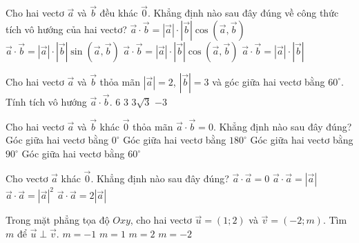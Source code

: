
\begin{ex}%
Cho hai vectơ $\vec{a}$ và $\vec{b}$ đều khác $\vec{0}$. Khẳng định nào sau đây đúng về công thức tích vô hướng của hai vectơ?
\choice
{$\vec{a}\cdot\vec{b}=|\vec{a}|\cdot|\vec{b}|\cos(\vec{a},\vec{b})$}
{$\vec{a}\cdot\vec{b}=|\vec{a}|\cdot|\vec{b}|\sin(\vec{a},\vec{b})$}
{\True $\vec{a}\cdot\vec{b}=|\vec{a}|\cdot|\vec{b}|\cos(\vec{a},\vec{b})$}
{$\vec{a}\cdot\vec{b}=|\vec{a}|\cdot|\vec{b}|$}
\end{ex}

\begin{ex}%
Cho hai vectơ $\vec{a}$ và $\vec{b}$ thỏa mãn $|\vec{a}|=2$, $|\vec{b}|=3$ và góc giữa hai vectơ bằng $60^\circ$. Tính tích vô hướng $\vec{a}\cdot\vec{b}$.
\choice
{$6$}
{\True $3$}
{$3\sqrt{3}$}
{$-3$}
\end{ex}

\begin{ex}%
Cho hai vectơ $\vec{a}$ và $\vec{b}$ khác $\vec{0}$ thỏa mãn $\vec{a}\cdot\vec{b}=0$. Khẳng định nào sau đây đúng?
\choice
{Góc giữa hai vectơ bằng $0^\circ$}
{Góc giữa hai vectơ bằng $180^\circ$}
{\True Góc giữa hai vectơ bằng $90^\circ$}
{Góc giữa hai vectơ bằng $60^\circ$}
\end{ex}

\begin{ex}%
Cho vectơ $\vec{a}$ khác $\vec{0}$. Khẳng định nào sau đây đúng?
\choice
{$\vec{a}\cdot\vec{a}=0$}
{$\vec{a}\cdot\vec{a}=|\vec{a}|$}
{\True $\vec{a}\cdot\vec{a}=|\vec{a}|^2$}
{$\vec{a}\cdot\vec{a}=2|\vec{a}|$}
\end{ex}

\begin{ex}%
Trong mặt phẳng tọa độ $Oxy$, cho hai vectơ $\vec{u}=(1;2)$ và $\vec{v}=(-2;m)$. Tìm $m$ để $\vec{u}\perp\vec{v}$.
\choice
{$m=-1$}
{\True $m=1$}
{$m=2$}
{$m=-2$}
\end{ex}

